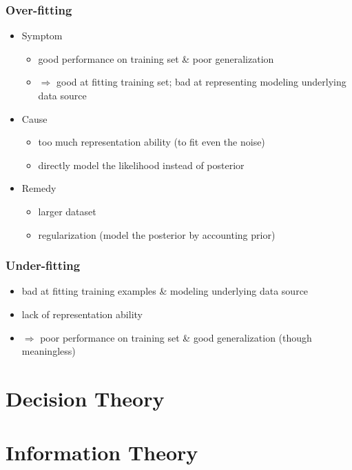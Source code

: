 \subsubsection{Over-fitting}
\begin{itemize}
\item Symptom
	\begin{itemize}
	\item good performance on training set \& poor generalization
	\item $\Rightarrow$ good at fitting training set; bad at representing modeling underlying data source
	\end{itemize}
\item Cause
	\begin{itemize}
	\item too much representation ability (to fit even the noise)
	\item directly model the likelihood instead of posterior
	\end{itemize}
\item Remedy
	\begin{itemize}
	\item larger dataset
	\item regularization (model the posterior by accounting prior)
	\end{itemize}
\end{itemize}
\subsubsection{Under-fitting}
\begin{itemize}
\item bad at fitting training examples \& modeling underlying data source
\item lack of representation ability
\item $\Rightarrow$ poor performance on training set \& good generalization (though meaningless)
\end{itemize}

 \section{Decision Theory}
 \subsection{}
 
 \section{Information Theory}
 

